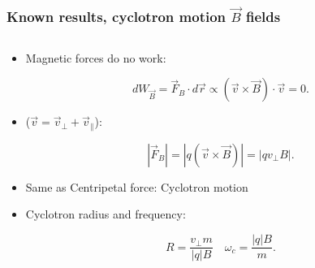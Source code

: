 \documentclass{beamer}
\begin{document}
\begin{frame}
\frametitle{Known results, cyclotron motion $\vec{B}$ fields}
\begin{columns}
\begin{column}{0.5\linewidth}
\begin{itemize}
\item<2-> Magnetic forces do no work:

\begin{equation*}
dW_{\vec{B}}= \vec{F}_B \cdot d\vec{r}\propto (\vec{v}\times \vec{B})\cdot \vec{v} = 0.
\end{equation*}

\item<3-> ($\vec{v}=\vec{v}_\perp+\vec{v}_\parallel$):

\begin{equation*}
|\vec{F}_B| = |q ( \vec{v}\times \vec{B})| =|q v_{\perp} B|.
\end{equation*}
\item<4-> Same as Centripetal force: Cyclotron motion

\item<5-> Cyclotron radius and frequency:

\begin{equation*}
R = \frac{v_\perp m}{|q|B} \quad \omega_c =\frac{|q|B}{m}.
\end{equation*}


\end{itemize}
\end{column}
\end{columns}
\end{frame}
\end{document}

